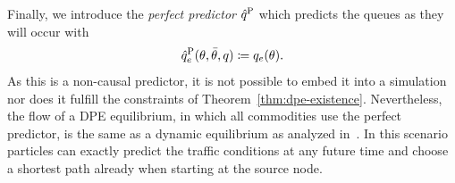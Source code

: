 Finally, we introduce the \emph{perfect predictor} $\hat q^{\text{P}}$ which predicts the queues as they will occur with \[
    \hat q^{\text{P}}_e(\theta,\bar\theta,q) \coloneqq q_e(\theta).
\]
As this is a non-causal predictor, it is not possible to embed it into a simulation nor does it fulfill the constraints of Theorem~\ref{thm:dpe-existence}.
Nevertheless, the flow of a DPE equilibrium, in which all commodities use the perfect predictor, is the same as a dynamic equilibrium as analyzed in~\cite[Definition~2]{Cominetti2015}.
In this scenario particles can exactly predict the traffic conditions at any future time and choose a shortest path already when starting at the source node.

